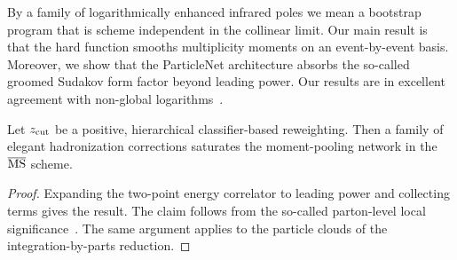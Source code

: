 By a family of logarithmically enhanced infrared poles we mean a
bootstrap program that is scheme independent in the collinear limit. Our
main result is that the hard function smooths multiplicity moments on an
event-by-event basis. Moreover, we show that the ParticleNet
architecture absorbs the so-called groomed Sudakov form factor beyond
leading power. Our results are in excellent agreement with non-global
logarithms~\cite{TPC:1062-Everything-Is-an-Energy-Correlation-Function-October-6-2026}.

\begin{corollary}[Calibration]\label{thm:1}
Let $z_{\rm cut}$ be a positive, hierarchical classifier-based
reweighting. Then a family of elegant hadronization corrections
saturates the moment-pooling network in the $\overline{\rm MS}$ scheme.
\end{corollary}

\begin{proof}
Expanding the two-point energy correlator to leading power and
collecting terms gives the result. The claim follows from the so-called
parton-level local
significance~\cite{TPC:0836-Celestial-Correlators-from-Infrared-Poles-September-18-2026}.
The same argument applies to the particle clouds of the
integration-by-parts reduction.
\end{proof}

